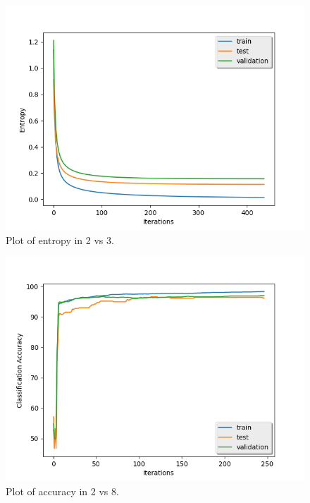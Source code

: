 \documentclass{article} %
\begin{document}
\begin{figure}[H]
\begin{center}
\includegraphics[width=0.8\linewidth]{plt_2vs3_losses.png}
\end{center}
\caption{Plot of entropy in 2 vs 3.}
\end{figure}

\begin{figure}[H]
\begin{center}
\includegraphics[width=0.8\linewidth]{plt_2vs8_accuracy.png}
\end{center}
\caption{Plot of accuracy in 2 vs 8.}
\end{figure}
\end{document}
